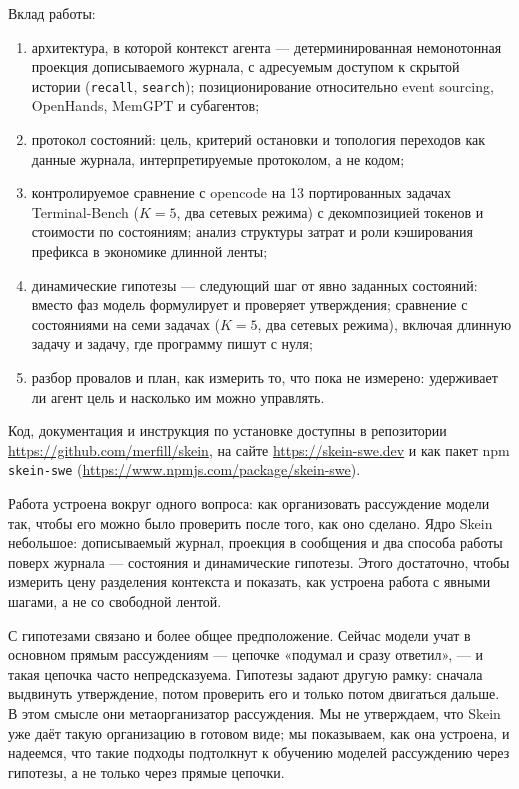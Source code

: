 \documentclass[11pt,a4paper]{article}
\begin{document}
Вклад работы:
\begin{enumerate}[leftmargin=1.4em,itemsep=0.2em]
  \item архитектура, в которой контекст агента --- детерминированная немонотонная проекция
  дописываемого журнала, с адресуемым доступом к скрытой истории (\texttt{recall},
  \texttt{search}); позиционирование относительно event sourcing, OpenHands, MemGPT и
  субагентов;
  \item протокол состояний: цель, критерий остановки и топология переходов как данные
  журнала, интерпретируемые протоколом, а не кодом;
  \item контролируемое сравнение с opencode на 13 портированных задачах Terminal-Bench
  ($K=5$, два сетевых режима) с декомпозицией токенов и стоимости по состояниям;
  анализ структуры затрат и роли кэширования префикса в экономике длинной ленты;
  \item динамические гипотезы --- следующий шаг от явно заданных состояний: вместо фаз модель
  формулирует и проверяет утверждения; сравнение с состояниями на семи задачах ($K=5$, два
  сетевых режима), включая длинную задачу и задачу, где программу пишут с нуля;
  \item разбор провалов и план, как измерить то, что пока не измерено: удерживает ли агент
  цель и насколько им можно управлять.
\end{enumerate}

Код, документация и инструкция по установке доступны в репозитории
\url{https://github.com/merfill/skein}, на сайте \url{https://skein-swe.dev} и как пакет
npm \texttt{skein-swe} (\url{https://www.npmjs.com/package/skein-swe}).

Работа устроена вокруг одного вопроса: как организовать рассуждение модели так, чтобы его
можно было проверить после того, как оно сделано. Ядро Skein небольшое: дописываемый журнал,
проекция в сообщения и два способа работы поверх журнала --- состояния и динамические
гипотезы. Этого достаточно, чтобы измерить цену разделения контекста и показать, как устроена
работа с явными шагами, а не со свободной лентой.

С гипотезами связано и более общее предположение. Сейчас модели учат в основном прямым
рассуждениям --- цепочке «подумал и сразу ответил», --- и такая цепочка часто непредсказуема.
Гипотезы задают другую рамку: сначала выдвинуть утверждение, потом проверить его и только
потом двигаться дальше. В этом смысле они метаорганизатор рассуждения. Мы не утверждаем, что
Skein уже даёт такую организацию в готовом виде; мы показываем, как она устроена, и надеемся,
что такие подходы подтолкнут к обучению моделей рассуждению через гипотезы, а не только через
прямые цепочки.
\end{document}

